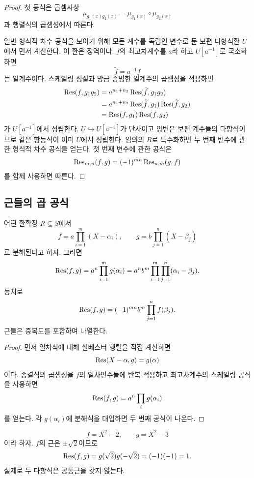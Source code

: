 \begin{proof}
첫 등식은 곱셈사상
\[
  \mu_{g_1(x)g_2(x)}
  =\mu_{g_1(x)}\circ\mu_{g_2(x)}
\]
과 행렬식의 곱셈성에서 따른다.

일반 형식적 차수 공식을 보이기 위해 모든 계수를 독립인 변수로 둔 보편 다항식환 $U$에서 먼저 계산한다. 이 환은 정역이다. $f$의 최고차계수를 $a$라 하고 $U[a^{-1}]$로 국소화하면
\[
  \widetilde f=a^{-1}f
\]
는 일계수이다. 스케일링 성질과 방금 증명한 일계수의 곱셈성을 적용하면
\[
\begin{aligned}
  \operatorname{Res}(f,g_1g_2)
  &=a^{n_1+n_2}\operatorname{Res}(\widetilde f,g_1g_2)\\
  &=a^{n_1+n_2}\operatorname{Res}(\widetilde f,g_1)
    \operatorname{Res}(\widetilde f,g_2)\\
  &=\operatorname{Res}(f,g_1)\operatorname{Res}(f,g_2)
\end{aligned}
\]
가 $U[a^{-1}]$에서 성립한다. $U\hookrightarrow U[a^{-1}]$가 단사이고 양변은 보편 계수들의 다항식이므로 같은 항등식이 이미 $U$에서 성립한다. 임의의 $R$로 특수화하면 두 번째 변수에 관한 형식적 차수 공식을 얻는다. 첫 번째 변수에 관한 공식은
\[
  \operatorname{Res}_{m,n}(f,g)=(-1)^{mn}\operatorname{Res}_{n,m}(g,f)
\]
를 함께 사용하면 따른다.
\end{proof}

\subsection{근들의 곱 공식}

\begin{theorem}[종결식의 근 공식]
\label{thm:resultant-root-product}
어떤 환확장 $R\subseteq S$에서
\[
  f=a\prod_{i=1}^m(X-\alpha_i),
  \qquad
  g=b\prod_{j=1}^n(X-\beta_j)
\]
로 분해된다고 하자. 그러면
\[
  \operatorname{Res}(f,g)
  =a^n\prod_{i=1}^m g(\alpha_i)
  =a^n b^m
  \prod_{i=1}^m\prod_{j=1}^n(\alpha_i-\beta_j).
\]
동치로
\[
  \operatorname{Res}(f,g)
  =(-1)^{mn}b^m\prod_{j=1}^n f(\beta_j).
\]
근들은 중복도를 포함하여 나열한다.
\end{theorem}

\begin{proof}
먼저 일차식에 대해 실베스터 행렬을 직접 계산하면
\[
  \operatorname{Res}(X-\alpha,g)=g(\alpha)
\]
이다. 종결식의 곱셈성을 $f$의 일차인수들에 반복 적용하고 최고차계수의 스케일링 공식을 사용하면
\[
  \operatorname{Res}(f,g)=a^n\prod_i g(\alpha_i)
\]
를 얻는다. 각 $g(\alpha_i)$에 분해식을 대입하면 두 번째 공식이 나온다.
\end{proof}

\begin{example}
\[
  f=X^2-2,
  \qquad
  g=X^2-3
\]
이라 하자. $f$의 근은 $\pm\sqrt2$이므로
\[
  \operatorname{Res}(f,g)
  =g(\sqrt2)g(-\sqrt2)
  =(-1)(-1)=1.
\]
실제로 두 다항식은 공통근을 갖지 않는다.
\end{example}

